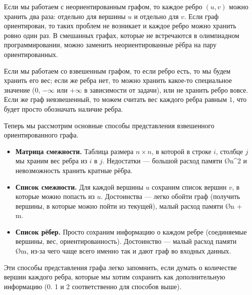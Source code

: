 Если мы работаем с неориентированным графом, то каждое ребро $(u, v)$ можно хранить два раза: отдельно для вершины $u$ и отдельно для $v$. Если граф ориентирован, то таких проблем не возникает и каждое ребро можно хранить ровно один раз. В смешанных графах, которые не встречаются в олимпиадном программировании, можно заменить неориентированные рёбра на пару ориентированных.

Если мы работаем со взвешенным графом, то если ребро есть, то мы будем хранить его вес; если же ребра нет, то можно хранить какое-то специальное значение ($0$, $-\infty$ или $+\infty$ в зависимости от задачи), или не хранить ребро вовсе. Если же граф невзвешенный, то можем считать вес каждого ребра равным $1$, что будет просто обозначать наличие ребра.

Теперь мы рассмотрим основные способы представления взвешенного ориентированного графа.

\begin{itemize}
    \item \textbf{Матрица смежности.} Таблица размера $n \times n$, в которой в строке $i$, столбце $j$ мы храним вес ребра из $i$ в $j$. Недостатки — большой расход памяти \O{n^2} и невозможность хранить кратные рёбра.
    \item \textbf{Список смежности.} Для каждой вершины $u$ сохраним список вершин $v$, в которые можно попасть из $u$. Достоинства — легко обойти граф (получить вершины, в которые можно пойти из текущей), малый расход памяти \O{n + m}.
    \item \textbf{Список рёбер.} Просто сохраним информацию о каждом ребре (соединяемые вершины, вес, ориентированность). Достоинство — малый расход памяти \O{m}, из-за чего чаще всего именно так и дают граф во входных данных.
\end{itemize}

Эти способы представления графа легко запомнить, если думать о количестве вершин каждого ребра, которые мы хотим сохранить как дополнительную информацию (0. 1 и 2 соответственно для способов выше).
